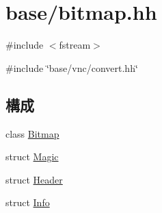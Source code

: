 \hypertarget{bitmap_8hh}{
\section{base/bitmap.hh}
\label{bitmap_8hh}
}
{\ttfamily \#include $<$fstream$>$}\par
{\ttfamily \#include \char`\"{}base/vnc/convert.hh\char`\"{}}\par
\subsection*{構成}
\begin{DoxyCompactItemize}
\item 
class \hyperlink{classBitmap}{Bitmap}
\item 
struct \hyperlink{structBitmap_1_1Magic}{Magic}
\item 
struct \hyperlink{structBitmap_1_1Header}{Header}
\item 
struct \hyperlink{structBitmap_1_1Info}{Info}
\end{DoxyCompactItemize}
